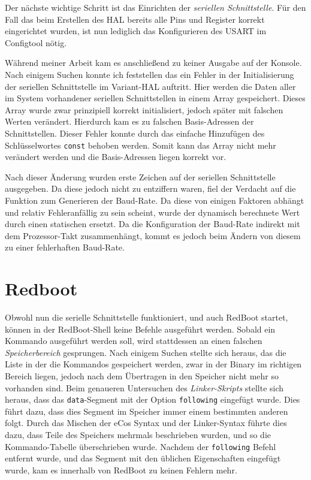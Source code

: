 \documentclass[
  a4paper,					%
  twoside,
  DIV=calc,     				%
  bibliography=totoc,
  cleardoublepage=empty,
  ngerman,     					%
  final       					%
]{scrbook}
\begin{document}
Der nächste wichtige Schritt ist das Einrichten der \emph{seriellen Schnittstelle}. Für den Fall das beim Erstellen des HAL bereits alle Pins und Register korrekt eingerichtet wurden, ist nun lediglich das Konfigurieren des USART im Configtool nötig. 

Während meiner Arbeit kam es anschließend zu keiner Ausgabe auf der Konsole. Nach einigem Suchen konnte ich feststellen das ein Fehler in der Initialisierung der seriellen Schnittstelle im Variant-HAL auftritt. Hier werden die Daten aller im System vorhandener seriellen Schnittstellen in einem Array gespeichert. Dieses Array wurde zwar prinzipiell korrekt initialisiert, jedoch später mit falschen Werten verändert. Hierdurch kam es zu falschen Basis-Adressen der Schnittstellen. Dieser Fehler konnte durch das einfache Hinzufügen des Schlüsselwortes \texttt{const} behoben werden. Somit kann das Array nicht mehr verändert werden und die Basis-Adressen liegen korrekt vor. 

Nach dieser Änderung wurden erste Zeichen auf der seriellen Schnittstelle ausgegeben. Da diese jedoch nicht zu entziffern waren, fiel der Verdacht auf die Funktion zum Generieren der Baud-Rate. Da diese von einigen Faktoren abhängt und relativ Fehleranfällig zu sein scheint, wurde der dynamisch berechnete Wert durch einen statischen ersetzt. Da die Konfiguration der Baud-Rate indirekt mit dem Prozessor-Takt zusammenhängt, kommt es jedoch beim Ändern von diesem zu einer fehlerhaften Baud-Rate. 

\section{Redboot}
\label{sec:Reboot}

Obwohl nun die serielle Schnittstelle funktioniert, und auch RedBoot startet, können in der RedBoot-Shell keine Befehle ausgeführt werden. Sobald ein Kommando ausgeführt werden soll, wird stattdessen an einen falschen \emph{Speicherbereich} gesprungen. Nach einigem Suchen stellte sich heraus, das die Liste in der die Kommandos gespeichert werden, zwar in der Binary im richtigen Bereich liegen, jedoch nach dem Übertragen in den Speicher nicht mehr so vorhanden sind. Beim genaueren Untersuchen des \emph{Linker-Skripts} stellte sich heraus, dass das \texttt{data}-Segment mit der Option \texttt{following} eingefügt wurde. Dies führt dazu, dass dies Segment im Speicher immer einem bestimmten anderen folgt. Durch das Mischen der eCos Syntax und der Linker-Syntax führte dies dazu, dass Teile des Speichers mehrmals beschrieben wurden, und so die Kommando-Tabelle überschrieben wurde. Nachdem der \texttt{following} Befehl entfernt wurde, und das Segment mit den üblichen Eigenschaften eingefügt wurde, kam es innerhalb von RedBoot zu keinen Fehlern mehr.
\end{document}
